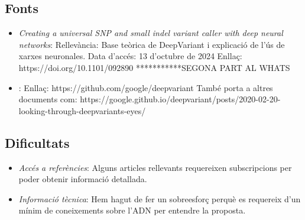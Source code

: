 \documentclass[a4paper]{article}
\begin{document}
	
	
	\subsection{Fonts}
	\begin{itemize}
		\item \emph{Creating a universal SNP and small indel variant caller with deep neural networks}:
		Rellevància: Base teòrica de DeepVariant i explicació de l'ús de xarxes neuronales.
		Data d'accés: 13 d'octubre de 2024
		Enllaç: https://doi.org/10.1101/092890
		***********SEGONA PART AL WHATS
		\item \emph{}:
		Enllaç: https://github.com/google/deepvariant
		També porta a altres documents com: https://google.github.io/deepvariant/posts/2020-02-20-looking-through-deepvariants-eyes/
	\end{itemize}
	
	\subsection{Dificultats}
	\begin{itemize}
		\item \emph{Accés a referències}: Alguns articles rellevants requereixen subscripcions per poder obtenir informació detallada.
		\item \emph{Informació tècnica}: Hem hagut de fer un sobreesforç perquè es requereix d'un mínim de coneixements sobre l'ADN per entendre la proposta.
	\end{itemize}

	
	
	
\end{document}

